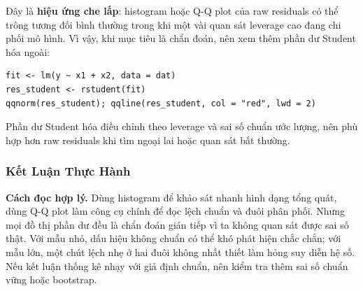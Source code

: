 Đây là \textbf{hiệu ứng che lấp}: histogram hoặc Q-Q plot của raw residuals có thể trông tương đối bình thường trong khi một vài quan sát leverage cao đang chi phối mô hình. Vì vậy, khi mục tiêu là chẩn đoán, nên xem thêm phần dư Student hóa ngoài:
\begin{lstlisting}[style=Rstyle]
fit <- lm(y ~ x1 + x2, data = dat)
res_student <- rstudent(fit)
qqnorm(res_student); qqline(res_student, col = "red", lwd = 2)
\end{lstlisting}

Phần dư Student hóa điều chỉnh theo leverage và sai số chuẩn ước lượng, nên phù hợp hơn raw residuals khi tìm ngoại lai hoặc quan sát bất thường.

\subsubsection{Kết Luận Thực Hành}

\begin{notebox}
\textbf{Cách đọc hợp lý.} Dùng histogram để khảo sát nhanh hình dạng tổng quát, dùng Q-Q plot làm công cụ chính để đọc lệch chuẩn và đuôi phân phối. Nhưng mọi đồ thị phần dư đều là chẩn đoán gián tiếp vì ta không quan sát được sai số thật. Với mẫu nhỏ, dấu hiệu không chuẩn có thể khó phát hiện chắc chắn; với mẫu lớn, một chút lệch nhẹ ở hai đuôi không nhất thiết làm hỏng suy diễn hệ số. Nếu kết luận thống kê nhạy với giả định chuẩn, nên kiểm tra thêm sai số chuẩn vững hoặc bootstrap.
\end{notebox}

